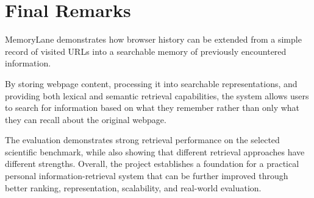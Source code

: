 \documentclass{tietreport}
\begin{document}
\section{Final Remarks}

MemoryLane demonstrates how browser history can be extended
from a simple record of visited URLs into a searchable memory
of previously encountered information.

By storing webpage content, processing it into searchable
representations, and providing both lexical and semantic
retrieval capabilities, the system allows users to search for
information based on what they remember rather than only what
they can recall about the original webpage.

The evaluation demonstrates strong retrieval performance on
the selected scientific benchmark, while also showing that
different retrieval approaches have different strengths.
Overall, the project establishes a foundation for a practical
personal information-retrieval system that can be further
improved through better ranking, representation, scalability,
and real-world evaluation.


\printbibliography[heading=bibintoc]
\end{document}
